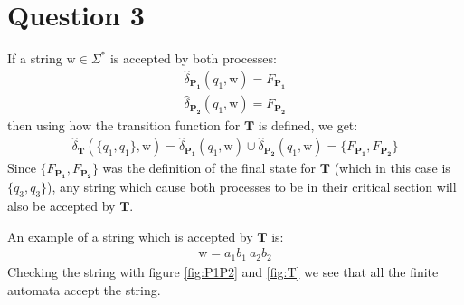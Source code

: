 \section*{Question 3}

If a string $\mathrm{w} \in \Sigma^*$ is accepted by both processes:
\begin{gather*}
    \hat{\delta}_{\mathbf{P_1}}(q_1, \mathrm{w}) = F_{\mathbf{P_1}} \\
    \hat{\delta}_{\mathbf{P_2}}(q_1, \mathrm{w}) = F_{\mathbf{P_2}}
\end{gather*}
then using how the transition function for $\mathbf{T}$ is defined, we get:
\begin{gather*}
    \hat{\delta}_{\mathbf{T}}(\{q_1, q_1\}, \mathrm{w}) = \hat{\delta}_{\mathbf{P_1}}(q_1, \mathrm{w}) \cup \hat{\delta}_{\mathbf{P_2}}(q_1, \mathrm{w}) = \{F_{\mathbf{P_1}}, F_{\mathbf{P_2}}\}
\end{gather*}
Since $\{F_{\mathbf{P_1}}, F_{\mathbf{P_2}}\}$ was the definition of the final state for $\mathbf{T}$ (which in this case is $\{q_3, q_3\}$), any string which cause both processes to be in their critical section will also be accepted by $\mathbf{T}$.

An example of a string which is accepted by $\mathbf{T}$ is:
\begin{gather*}
   \mathrm{w} = a_1 b_1 \: a_2 b_2
\end{gather*}
Checking the string with figure \ref{fig:P1P2} and \ref{fig:T} we see that all the finite automata accept the string.